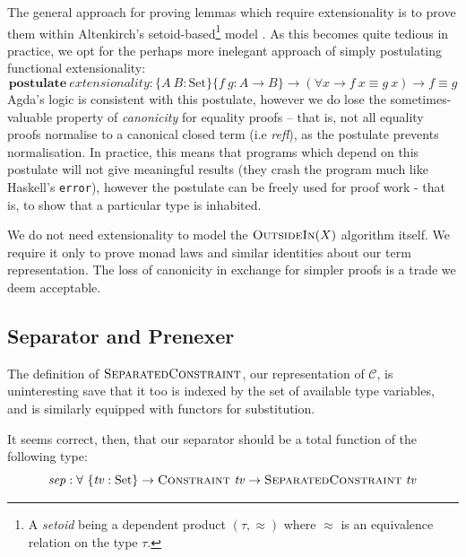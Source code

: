 \documentclass[a4paper]{jfp}
\newcommand{\outsidein}{\textsc{OutsideIn}(X)}
\begin{document}
The general approach for proving lemmas which require extensionality is to prove them within Altenkirch's setoid-based\footnote{A \emph{setoid} being
   a dependent product $(\tau, \approx)$ where $\approx$ is an equivalence relation on the type $\tau$.} model
\cite{Altenkirch:1999:EEI:788021.788977}. As this becomes quite tedious in practice, we opt for the perhaps more inelegant approach of simply
postulating functional extensionality:
\begin{displaymath}
	\textbf{postulate}\ \mathit{extensionality} : \{A\ B : \text{Set}\}\{f\ g : A \rightarrow B \} 
                   \rightarrow (\forall x \rightarrow f\ x \equiv g\ x) \rightarrow f \equiv g
\end{displaymath}
Agda's logic is consistent with this postulate, however we do lose the sometimes-valuable property of \emph{canonicity} for equality proofs -- that
is, not all equality proofs normalise to a canonical closed term (i.e \emph{refl}), as the postulate prevents normalisation. In practice, this means
that programs which depend on this postulate will not give meaningful results (they crash the program much like Haskell's {\tt error}), however the
postulate can be freely used for proof work - that is, to show that a particular type is inhabited.

We do not need extensionality to model the $\outsidein$ algorithm itself. We require it only to prove monad laws and similar identities about our term
representation. The loss of canonicity in exchange for simpler proofs is a trade we deem acceptable.

\subsection{Separator and Prenexer}

The definition of $\textsc{SeparatedConstraint}$, our representation of $\mathcal{C}$, is uninteresting save that it too is indexed by the set of
available type variables, and is similarly equipped with functors for substitution.

It seems correct, then, that our separator should be a total function of the following type:
\begin{displaymath}
   \mathit{sep} : \forall\ \{\mathit{tv} : \text{Set}\} \rightarrow \textsc{Constraint}\ \mathit{tv} \rightarrow \textsc{SeparatedConstraint}\
   \mathit{tv}
\end{displaymath}
\end{document}
